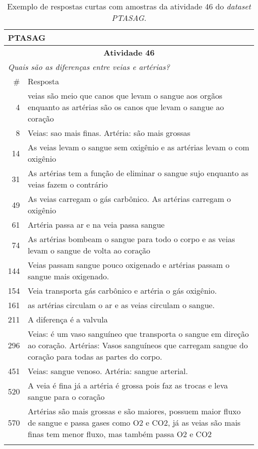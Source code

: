 \begin{table}[!b]
\centering
\caption{Exemplo de respostas curtas com amostras da atividade 46 do \textit{dataset PTASAG}.}
\label{tab-ptasag46-exemplo}
\begin{tabular}{ r | p{14cm}}
\hline
\multicolumn{2}{l}{\textbf{PTASAG}} \\ \hline
\multicolumn{2}{c}{\textbf{Atividade 46}} \\ \hline 
\multicolumn{2}{l}{\textit{Quais são as diferenças entre veias e artérias?}} \\ \hline
 \# & Resposta \\ \hline
 4 & veias são meio que canos que levam o sangue aos orgãos enquanto as artérias são os canos que levam o sangue ao coração \\
 8 & Veias: sao mais finas. Artéria: são mais grossas \\
 14 & As veias levam o sangue sem oxigênio e as artérias levam o com oxigênio \\
 31 & As artérias tem a função de eliminar o sangue sujo enquanto as veias fazem o contrário \\
 49 & As veias carregam o gás carbônico. As artérias carregam o oxigênio \\
 61 & Artéria passa ar e na veia passa sangue \\
 74  & As artérias bombeam o sangue para todo o corpo e as veias levam o sangue de volta ao coração \\
 144 & Veias passam sangue pouco oxigenado e artérias passam o sangue mais oxigenado. \\
 154 & Veia transporta gás carbônico e artéria o gás oxigênio. \\
 161 & as artérias circulam o ar e as veias circulam o sangue. \\
 211 & A diferença é a valvula \\
 296 & Veias: é um vaso sanguíneo que transporta o sangue em direção ao coração. Artérias: Vasos sanguíneos que carregam sangue do coração para todas as partes do corpo. \\
 451 & Veias: sangue venoso. Artéria: sangue arterial. \\
 520 & A veia é fina já a artéria é grossa pois faz as trocas e leva sangue para o coração \\ 
 570 &  Artérias são mais grossas e são maiores, possuem maior fluxo de sangue e passa gases como O2 e CO2, já as veias são mais finas tem menor fluxo, mas também passa O2 e CO2 \\
\\
\hline
\hline
\end{tabular}
\end{table}


